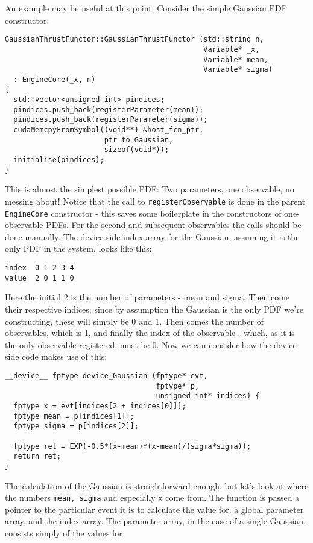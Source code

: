 \documentclass[12pt,pdflatex]{article}
\begin{document}
An example may be useful at this point. Consider the simple Gaussian PDF constructor:
\begin{verbatim}
GaussianThrustFunctor::GaussianThrustFunctor (std::string n, 
                                              Variable* _x, 
                                              Variable* mean, 
                                              Variable* sigma) 
  : EngineCore(_x, n) 
{
  std::vector<unsigned int> pindices;
  pindices.push_back(registerParameter(mean));
  pindices.push_back(registerParameter(sigma));
  cudaMemcpyFromSymbol((void**) &host_fcn_ptr, 
                       ptr_to_Gaussian, 
                       sizeof(void*));
  initialise(pindices); 
}
\end{verbatim}
This is almost the simplest possible PDF: Two parameters, one observable, 
no messing about! Notice that the call to \verb|registerObservable| is done
in the parent \verb|EngineCore| constructor - this saves some boilerplate
in the constructors of one-observable PDFs. For the second and subsequent
observables the calls should be done manually. The device-side index array
for the Gaussian, assuming it is the only PDF in the system, looks like this:
\begin{verbatim}
index  0 1 2 3 4
value  2 0 1 1 0
\end{verbatim}
Here the initial 2 is the number of parameters - mean and sigma. Then come their
respective indices; since by assumption the Gaussian is the only PDF we're constructing,
these will simply be 0 and 1. Then comes the number of observables, which is 1, and
finally the index of the observable - which, as it is the only observable registered,
must be 0. Now we can consider how the device-side code makes use of this:
\begin{verbatim}
__device__ fptype device_Gaussian (fptype* evt, 
                                   fptype* p, 
                                   unsigned int* indices) {
  fptype x = evt[indices[2 + indices[0]]]; 
  fptype mean = p[indices[1]];
  fptype sigma = p[indices[2]];

  fptype ret = EXP(-0.5*(x-mean)*(x-mean)/(sigma*sigma));
  return ret; 
}
\end{verbatim}
The calculation of the Gaussian is straightforward enough, but let's look
at where the numbers \verb|mean, sigma| and especially \verb|x| come from. 
The function is passed a pointer to the particular event it is to calculate
the value for, a global parameter array, and the index array. The parameter
array, in the case of a single Gaussian, consists simply of the values for
\end{document}
